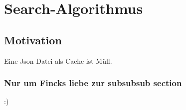 \section{Search-Algorithmus}
\subsection{Motivation}
Eine Json Datei als Cache ist Müll.
\subsubsection{Nur um Fincks liebe zur subsubsub section}
:)
